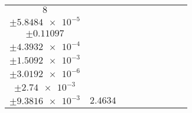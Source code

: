 \documentclass[8pt]{article}
\begin{document}
\begin{longtable}[l]{c c c c c c c c c}
$\num{8}$ & \begin{tabular}[c]{@{}c@{}}$\num{3.0484e-2}$ \\ $\pm\num{5.8484e-5}$\end{tabular} & \begin{tabular}[c]{@{}c@{}}$\num{0.91419}$ \\ $\pm\num{0.11097}$\end{tabular} & \begin{tabular}[c]{@{}c@{}}$\num{11.395}$ \\ $\pm\num{4.3932e-4}$\end{tabular} & \begin{tabular}[c]{@{}c@{}}$\num{1.1912e+3}$ \\ $\pm\num{1.5092e-3}$\end{tabular} & \begin{tabular}[c]{@{}c@{}}$\num{2.383}$ \\ $\pm\num{3.0192e-6}$\end{tabular} & \begin{tabular}[c]{@{}c@{}}$\num{1.1722}$ \\ $\pm\num{2.74e-3}$\end{tabular} & \begin{tabular}[c]{@{}c@{}}$\num{4.2137}$ \\ $\pm\num{9.3816e-3}$\end{tabular} & $\num{2.4634}$\\
\bottomrule
\end{longtable}
\end{document}
